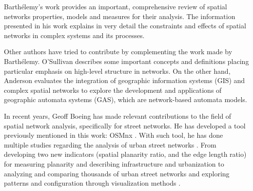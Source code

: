 Barthélemy's work \cite{barthelemy_spatial_2011, barthelemy_2018} provides an important, comprehensive review of spatial networks properties, models and measures for their analysis. The information presented in his work explains in very detail the constraints and effects of spatial networks in complex systems and its processes.

Other authors have tried to contribute by complementing the work made by Barthélemy. O'Sullivan \cite{osullivan2014} describes some important concepts and definitions placing particular emphasis on high-level structure in networks. On the other hand, Anderson \cite{anderson_2020} evaluates the integration of geographic information systems (GIS) and complex spatial networks to explore the development and applications of geographic automata systems (GAS), which are network-based automata models.

In recent years, Geoff Boeing has made relevant contributions to the field of spatial network analysis, specifically for street networks. He has developed a tool previously mentioned in this work: OSMnx \cite{boeing_osmnx_2017}. With such tool, he has done multiple studies regarding the analysis of urban street networks \cite{Boeing2019-morphology}. From developing two new indicators (spatial planarity ratio, and the edge length ratio) for measuring planarity and describing infrastructure and urbanization \cite{boeing2020-planarity} to analyzing and comparing thousands of urban street networks \cite{boeing_multi-scale_2018}  and exploring patterns and configuration through visualization methods \cite{Boeing2020-urban-form-osm}.
